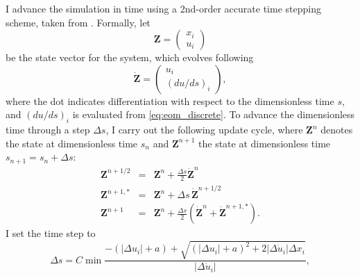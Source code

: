 \documentclass[useAMS,usenatbib]{mn2e}
\begin{document}
I advance the simulation in time using a 2nd-order accurate time stepping scheme, taken from \citet{cioffi88a}. Formally, let
\begin{equation}
\mathbf{Z} =
\left(
\begin{array}{c}
x_i \\
u_i
\end{array}
\right)
\end{equation}
be the state vector for the system, which evolves following
\begin{equation}
\dot{\mathbf{Z}} =
\left(
\begin{array}{c}
u_i \\
(du/ds)_i
\end{array}
\right),
\end{equation}
where the dot indicates differentiation with respect to the dimensionless time $s$, and $(du/ds)_i$ is evaluated from \autoref{eq:eom_discrete}. To advance the dimensionless time through a step $\Delta s$, I carry out the following update cycle, where $\mathbf{Z}^{n}$ denotes the state at dimensionless time $s_n$ and $\mathbf{Z}^{n+1}$ the state at dimensionless time $s_{n+1} = s_n + \Delta s$:
\begin{eqnarray}
\mathbf{Z}^{n+1/2} & = & \mathbf{Z}^{n} + \frac{\Delta s}{2}\dot{\mathbf{Z}}^{n} \\
\mathbf{Z}^{n+1,*} & = & \mathbf{Z}^{n} + \Delta s \, \dot{\mathbf{Z}}^{n+1/2} \\
\mathbf{Z}^{n+1} & = & \mathbf{Z}^{n} + \frac{\Delta s}{2} \left(\dot{\mathbf{Z}}^{n} + \dot{\mathbf{Z}}^{n+1,*}\right). 
\end{eqnarray}
I set the time step to
\begin{equation}
\Delta s = C \min \frac{-\left(\left|\Delta u_i\right| + a\right) + \sqrt{\left(\left|\Delta u_i\right|+a\right)^2 + 2 \left|\Delta \dot{u}_i\right| \Delta x_i}}{\left|\Delta\dot{u}_i\right|},
\end{equation}
\end{document}
